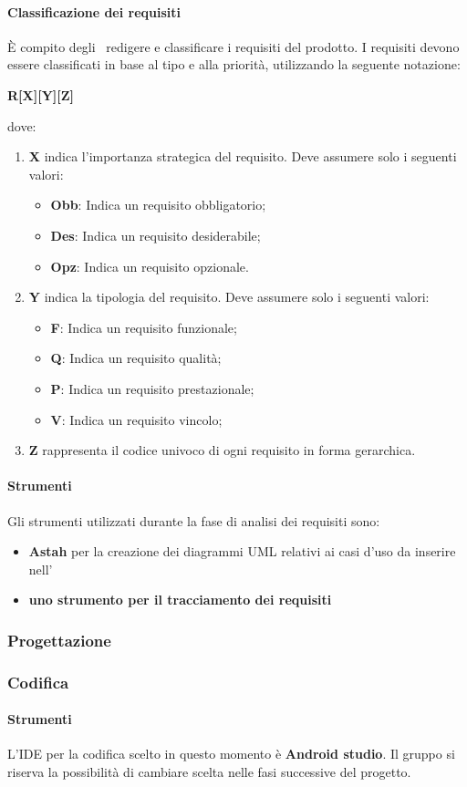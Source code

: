 \documentclass[../NormeProgetto.tex]{subfiles}
\begin{document}
			\paragraph{Classificazione dei requisiti}
			È compito degli \analisti\ redigere e classificare i requisiti del prodotto.  I requisiti devono essere classificati in base al tipo e alla priorità, utilizzando la seguente notazione:
			\begin{center}\textbf{R[X][Y][Z]}\end{center} dove:
				\begin{enumerate}
					\item \textbf{X} indica l'importanza strategica del requisito. Deve assumere solo i seguenti valori:
						\begin{itemize}
							\item \textbf{Obb}: Indica un requisito obbligatorio;
							\item \textbf{Des}: Indica un requisito desiderabile;
							\item \textbf{Opz}: Indica un requisito opzionale.
						\end{itemize}
					\item \textbf{Y} indica la tipologia del requisito. Deve assumere solo i seguenti valori:
						\begin{itemize}
							\item \textbf{F}: Indica un requisito funzionale;
							\item \textbf{Q}: Indica un requisito qualità;
							\item \textbf{P}: Indica un requisito prestazionale;
							\item \textbf{V}: Indica un requisito vincolo;
						\end{itemize}
					\item \textbf{Z} rappresenta il codice univoco di ogni requisito in forma gerarchica.
				\end{enumerate}
			\paragraph{Strumenti}
			Gli strumenti utilizzati durante la fase di analisi dei requisiti sono:
			\begin{itemize}
				\item \textbf{Astah} per la creazione dei diagrammi UML relativi ai casi d'uso da inserire nell'\analisideirequisiti\
				\item \textbf{uno strumento per il tracciamento dei requisiti}
			\end{itemize}
		\subsubsection{Progettazione}
		\subsubsection{Codifica}
			\paragraph{Strumenti}
			L'IDE per la codifica scelto in questo momento è \textbf{Android studio}. Il gruppo si riserva la possibilità di cambiare scelta nelle fasi successive del progetto.
\end{document}
